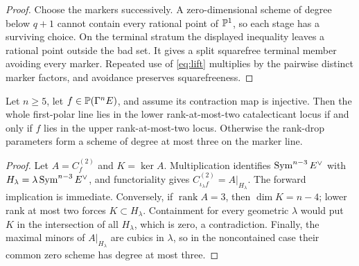 \begin{proof}
Choose the markers successively.  A zero-dimensional scheme of degree below
\(q+1\) cannot contain every rational point of \(\mathbb P^1\), so each stage has a
surviving choice.  On the terminal stratum the displayed inequality leaves a
rational point outside the bad set.  It gives a split squarefree
terminal member avoiding every marker.  Repeated use of \eqref{eq:lift}
multiplies by the pairwise distinct marker factors, and avoidance preserves
squarefreeness.
\end{proof}

\begin{proposition}
\label{prop:contained-rank-two}%
%
Let \(n\geq5\), let \(f\in\mathbb P(\Gamma^nE)\), and assume its contraction map is
injective.  Then the whole first-polar line lies in the lower rank-at-most-two
catalecticant locus if and only if \(f\) lies in the upper rank-at-most-two
locus.  Otherwise the rank-drop parameters form a scheme of degree at most
three on the marker line.
\end{proposition}

\begin{proof}
Let \(A=C_f^{(2)}\) and \(K=\ker A\).  Multiplication identifies
\(\operatorname{Sym}^{n-3}E^\vee\) with
\(H_\lambda=\lambda\operatorname{Sym}^{n-3}E^\vee\), and functoriality gives
\(C_{\iota_\lambda f}^{(2)}=A|_{H_\lambda}\).  The forward implication is
immediate.  Conversely, if \(\operatorname{rank}A=3\), then
\(\dim K=n-4\); lower rank at most two forces \(K\subset H_\lambda\).
Containment for every geometric \(\lambda\) would put \(K\) in the
intersection of all \(H_\lambda\), which is zero, a contradiction.
Finally, the maximal minors of \(A|_{H_\lambda}\) are cubics in \(\lambda\),
so in the noncontained case their common zero scheme has degree at most
three.
\end{proof}
